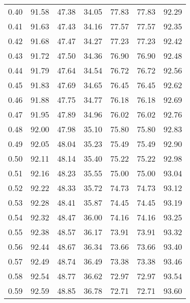 \begin{tabular}{|c|c|c|c|c|c|c|}
      0.40 &     91.58 &     47.38 &      34.05 &   77.83 &      77.83 &         92.29 \\
      0.41 &     91.63 &     47.43 &      34.16 &   77.57 &      77.57 &         92.35 \\
      0.42 &     91.68 &     47.47 &      34.27 &   77.23 &      77.23 &         92.42 \\
      0.43 &     91.72 &     47.50 &      34.36 &   76.90 &      76.90 &         92.48 \\
      0.44 &     91.79 &     47.64 &      34.54 &   76.72 &      76.72 &         92.56 \\
      0.45 &     91.83 &     47.69 &      34.65 &   76.45 &      76.45 &         92.62 \\
      0.46 &     91.88 &     47.75 &      34.77 &   76.18 &      76.18 &         92.69 \\
      0.47 &     91.95 &     47.89 &      34.96 &   76.02 &      76.02 &         92.76 \\
      0.48 &     92.00 &     47.98 &      35.10 &   75.80 &      75.80 &         92.83 \\
      0.49 &     92.05 &     48.04 &      35.23 &   75.49 &      75.49 &         92.90 \\
      0.50 &     92.11 &     48.14 &      35.40 &   75.22 &      75.22 &         92.98 \\
      0.51 &     92.16 &     48.23 &      35.55 &   75.00 &      75.00 &         93.04 \\
      0.52 &     92.22 &     48.33 &      35.72 &   74.73 &      74.73 &         93.12 \\
      0.53 &     92.28 &     48.41 &      35.87 &   74.45 &      74.45 &         93.19 \\
      0.54 &     92.32 &     48.47 &      36.00 &   74.16 &      74.16 &         93.25 \\
      0.55 &     92.38 &     48.57 &      36.17 &   73.91 &      73.91 &         93.32 \\
      0.56 &     92.44 &     48.67 &      36.34 &   73.66 &      73.66 &         93.40 \\
      0.57 &     92.49 &     48.74 &      36.49 &   73.38 &      73.38 &         93.46 \\
      0.58 &     92.54 &     48.77 &      36.62 &   72.97 &      72.97 &         93.54 \\
      0.59 &     92.59 &     48.85 &      36.78 &   72.71 &      72.71 &         93.60 \\

\end{tabular}
